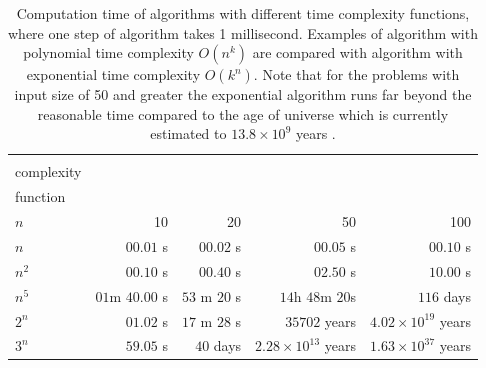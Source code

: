 \begin{table}[ht]
\footnotesize
\begin{tabular}{|l|r|r|r|r|}
\hline
\diagbox[height=43pt,width=125pt]{time\\complexity\\function}{input size \\ $n$} & 10          & 20        & 50             & 100            \\ \hline
$n$                                                                           & $00.01$ s     & $00.02$ s   & $00.05$ s        & $00.10$ s        \\ \hline
$n^2$                                                                         & $00.10$ s     & $00.40$ s   & $02.50$ s        & $10.00$ s        \\ \hline
$n^5$                                                                         & $01$m $40.00$ s & $53$ m $20$ s & $14$h $48$m $20$s    & $116$ days       \\ \hline
$2^n$                                                                         & $01.02$ s     & $17$ m $28$ s & $35702$ years    & $4.02\times 10^{19}$ years \\ \hline
$3^n$                                                                         & $59.05$ s     & $40$ days   & $2.28\times 10^{13}$ years & $1.63\times 10^{37}$ years \\ \hline
\end{tabular}
\caption{Computation time of algorithms with different time complexity functions, where one step of algorithm takes 1 millisecond. Examples of algorithm with polynomial time complexity $O(n^k)$ are compared with algorithm with exponential time complexity $O(k^n)$. Note that for the problems with input size of 50 and greater the exponential algorithm runs far beyond the reasonable time compared to the age of universe which is currently estimated to $13.8\times 10^9$  years \cite{PlanckCollaboration2013}.}
\label{table:timecomplexity}
\end{table}

